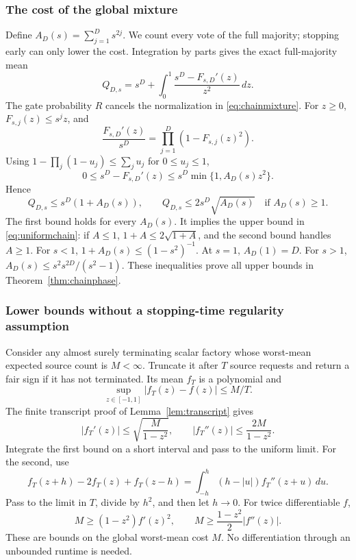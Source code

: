\subsubsection{The cost of the global mixture}

Define \(A_D(s)=\sum_{j=1}^D s^{2j}\).
We count every vote of the full majority; stopping early can only
lower the cost. Integration by parts gives the exact full-majority mean
\begin{equation}\label{eq:chainarity}
Q_{D,s}=s^D+
\int_0^1\frac{s^D-F_{s,D}'(z)}{z^2}\,dz.
\end{equation}
The gate probability \(R\) cancels the normalization in
\eqref{eq:chainmixture}.
For \(z\ge0\), \(F_{s,j}(z)\le s^jz\), and
\[
\frac{F_{s,D}'(z)}{s^D}
=\prod_{j=1}^D(1-F_{s,j}(z)^2).
\]
Using \(1-\prod_j(1-u_j)\le\sum_ju_j\) for \(0\le u_j\le1\),
\[
0\le s^D-F_{s,D}'(z)
\le s^D\min\{1,A_D(s)z^2\}.
\]
Hence
\begin{equation}\label{eq:chainQ}
Q_{D,s}\le s^D(1+A_D(s)),\qquad
Q_{D,s}\le2s^D\sqrt{A_D(s)}\quad\text{if }A_D(s)\ge1.
\end{equation}
The first bound holds for every \(A_D(s)\).
It implies the upper bound in \eqref{eq:uniformchain}: if \(A\le1\),
\(1+A\le2\sqrt{1+A}\), and the second bound handles \(A\ge1\).
For \(s<1\), \(1+A_D(s)\le(1-s^2)^{-1}\).
At \(s=1\), \(A_D(1)=D\).
For \(s>1\),
\(A_D(s)\le s^2s^{2D}/(s^2-1)\).
These inequalities prove all upper bounds in
Theorem~\ref{thm:chainphase}.

\subsubsection{Lower bounds without a stopping-time regularity assumption}

Consider any almost surely terminating scalar factory whose
worst-mean expected source count is \(M<\infty\).
Truncate it after \(T\) source requests and return a fair sign if
it has not terminated. Its mean \(f_T\) is a polynomial and
\[
\sup_{z\in[-1,1]}|f_T(z)-f(z)|\le M/T.
\]
The finite transcript proof of Lemma~\ref{lem:transcript} gives
\[
|f_T'(z)|\le\sqrt{\frac{M}{1-z^2}},\qquad
|f_T''(z)|\le\frac{2M}{1-z^2}.
\]
Integrate the first bound on a short interval and pass to the
uniform limit. For the second, use
\[
f_T(z+h)-2f_T(z)+f_T(z-h)
=\int_{-h}^h(h-|u|)f_T''(z+u)\,du.
\]
Pass to the limit in \(T\), divide by \(h^2\), and then let
\(h\to0\). For twice differentiable \(f\),
\begin{equation}\label{eq:unknownlower}
M\ge(1-z^2)f'(z)^2,\qquad
M\ge\frac{1-z^2}{2}|f''(z)|.
\end{equation}
These are bounds on the global worst-mean cost \(M\).
No differentiation through an unbounded runtime is needed.

